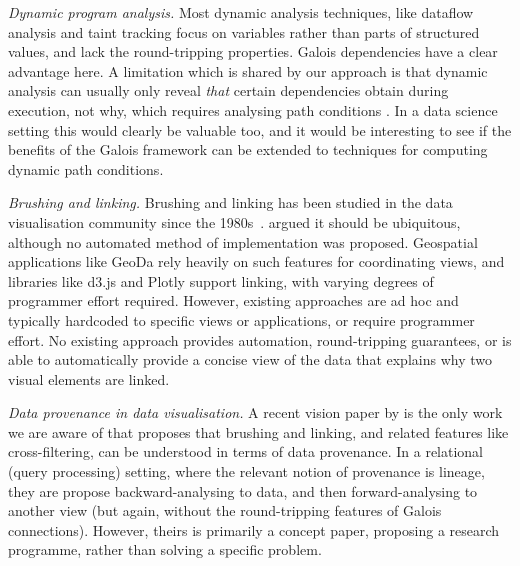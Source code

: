 \emph{Dynamic program analysis.} Most dynamic analysis techniques, like dataflow analysis \cite{chen88,reps95} and taint tracking \cite{reps95} focus on variables rather than parts of structured values, and lack the round-tripping properties. Galois dependencies have a clear advantage here. A limitation which is shared by our approach is that dynamic analysis can usually only reveal \emph{that} certain dependencies obtain during execution, not why, which requires analysing path conditions \cite{hammer06}. In a data science setting this would clearly be valuable too, and it would be interesting to see if the benefits of the Galois framework can be extended to techniques for computing dynamic path conditions.

\emph{Brushing and linking.} Brushing and linking has been studied in the data visualisation community since the 1980s~\cite{mcdonald82,becker87}. \citet{roberts06} argued it should be ubiquitous, although no automated method of implementation was proposed. Geospatial applications like GeoDa \cite{anselin06} rely heavily on such features for coordinating views, and libraries like d3.js and Plotly support linking, with varying degrees of programmer effort required. However, existing approaches are ad hoc and typically hardcoded to specific views or applications, or require programmer effort. No existing approach provides automation, round-tripping guarantees, or is able to automatically provide a concise view of the data that explains why two visual elements are linked.

\emph{Data provenance in data visualisation.} A recent vision paper by \citet{psallidas18} is the only work we are aware of that proposes that brushing and linking, and related features like cross-filtering, can be understood in terms of data provenance. In a relational (query processing) setting, where the relevant notion of provenance is lineage, they are propose backward-analysing to data, and then forward-analysing to another view (but again, without the round-tripping features of Galois connections). However, theirs is primarily a concept paper, proposing a research programme, rather than solving a specific problem.
